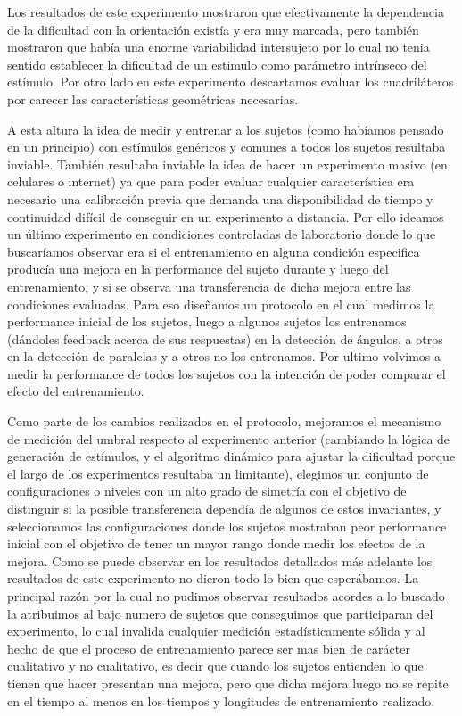 \documentclass{article}
\begin{document}
    Los resultados de este experimento mostraron que efectivamente la dependencia de la dificultad con la orientación existía y era muy marcada, pero también mostraron que había una enorme variabilidad intersujeto por lo cual no tenia sentido establecer la dificultad de un estimulo como parámetro intrínseco del estímulo. Por otro lado en este experimento descartamos evaluar los cuadriláteros por carecer las características geométricas necesarias. 
    
    A esta altura la idea de medir y entrenar a los sujetos (como habíamos pensado en un principio) con estímulos genéricos y comunes a todos los sujetos resultaba inviable. También resultaba inviable la idea de hacer un experimento masivo (en celulares o internet) ya que para poder evaluar cualquier característica era necesario una calibración previa que demanda una disponibilidad de tiempo y continuidad difícil de conseguir en un experimento a distancia. Por ello ideamos un último experimento en condiciones controladas de laboratorio donde lo que buscaríamos observar era si el entrenamiento en alguna condición especifica producía una mejora en la performance del sujeto durante y luego del entrenamiento, y si se observa una transferencia de dicha mejora entre las condiciones evaluadas. Para eso diseñamos un protocolo en el cual medimos la performance inicial de los sujetos, luego a algunos sujetos los entrenamos (dándoles feedback acerca de sus respuestas) en la detección de ángulos, a otros en la detección de paralelas y a otros no los entrenamos. Por ultimo volvimos a medir la performance de todos los sujetos con la intención de poder comparar el efecto del entrenamiento. 
    
    Como parte de los cambios realizados en el protocolo, mejoramos el mecanismo de medición del umbral respecto al experimento anterior (cambiando la lógica de generación de estímulos, y el algoritmo dinámico para ajustar la dificultad porque el largo de los experimentos resultaba un limitante), elegimos un conjunto de configuraciones o niveles con un alto grado de simetría con el objetivo de distinguir si la posible transferencia dependía de algunos de estos invariantes, y seleccionamos las configuraciones donde los sujetos mostraban peor performance inicial con el objetivo de tener un mayor rango donde medir los efectos de la mejora. Como se puede observar en los resultados detallados más adelante los resultados de este experimento no dieron todo lo bien que esperábamos. La principal razón por la cual no pudimos observar resultados acordes a lo buscado la atribuimos al bajo numero de sujetos que conseguimos que participaran del experimento, lo cual invalida cualquier medición estadísticamente sólida y al hecho de que el proceso de entrenamiento parece ser mas bien de carácter cualitativo y no cualitativo, es decir que cuando los sujetos entienden lo que tienen que hacer presentan una mejora, pero que dicha mejora luego no se repite en el tiempo al menos en los tiempos y longitudes de entrenamiento realizado. 
    
\end{document}
